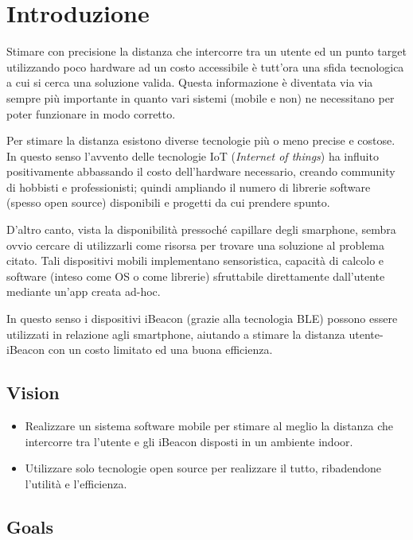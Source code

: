 \chapter{Introduzione}
	Stimare con precisione la distanza che intercorre tra un utente ed un punto target utilizzando poco hardware ad un costo accessibile è tutt'ora una sfida tecnologica a cui si cerca una soluzione valida. Questa informazione è diventata via via sempre più importante in quanto vari sistemi (mobile e non) ne necessitano per poter funzionare in modo corretto. 
	
	Per stimare la distanza esistono diverse tecnologie più o meno precise e costose. In questo senso l'avvento delle tecnologie IoT (\textit{Internet of things}) ha influito positivamente abbassando il costo dell'hardware necessario, creando community di hobbisti e professionisti; quindi ampliando il numero di librerie software (spesso open source) disponibili e progetti da cui prendere spunto.
	
	D'altro canto, vista la disponibilità pressoché capillare degli smarphone, sembra ovvio cercare di utilizzarli come risorsa per trovare una soluzione al problema citato. Tali dispositivi mobili implementano sensoristica, capacità di calcolo e software (inteso come OS o come librerie) sfruttabile direttamente dall'utente mediante un'app creata ad-hoc.
	
	In questo senso i dispositivi iBeacon (grazie alla tecnologia BLE) possono essere utilizzati in relazione agli smartphone, aiutando a stimare la distanza utente-iBeacon con un costo limitato ed una buona efficienza.
	
\section{Vision}

\begin{itemize}
	\item Realizzare un sistema software mobile per stimare al meglio la distanza che intercorre tra l'utente e gli iBeacon disposti in un ambiente indoor.
	
	\item Utilizzare solo tecnologie open source per realizzare il tutto, ribadendone l'utilità e l'efficienza.
\end{itemize}

\section{Goals}
